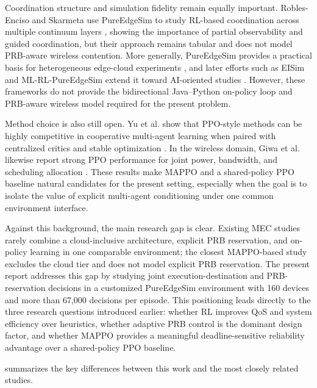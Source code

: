 Coordination structure and simulation fidelity remain equally important. Robles-Enciso and Skarmeta use PureEdgeSim to study RL-based coordination across multiple continuum layers \cite{robles2022continuum, robles2023multilayer}, showing the importance of partial observability and guided coordination, but their approach remains tabular and does not model PRB-aware wireless contention. More generally, PureEdgeSim provides a practical basis for heterogeneous edge-cloud experiments \cite{mechalikh2021pureedgesim}, and later efforts such as EISim and ML-RL-PureEdgeSim extend it toward AI-oriented studies \cite{abid2023eisim, mlrlpureedgesimgithub}. However, these frameworks do not provide the bidirectional Java--Python on-policy loop and PRB-aware wireless model required for the present problem.

Method choice is also still open. Yu et al. show that PPO-style methods can be highly competitive in cooperative multi-agent learning when paired with centralized critics and stable optimization \cite{yu2022surprising}. In the wireless domain, Giwa et al. likewise report strong PPO performance for joint power, bandwidth, and scheduling allocation \cite{giwa2025hetnet}. These results make MAPPO and a shared-policy PPO baseline natural candidates for the present setting, especially when the goal is to isolate the value of explicit multi-agent conditioning under one common environment interface.

Against this background, the main research gap is clear. Existing MEC studies rarely combine a cloud-inclusive architecture, explicit PRB reservation, and on-policy learning in one comparable environment; the closest MAPPO-based study \cite{sun2023hdmappo} excludes the cloud tier and does not model explicit PRB reservation. The present report addresses this gap by studying joint execution-destination and PRB-reservation decisions in a customized PureEdgeSim environment with 160 devices and more than 67,000 decisions per episode. This positioning leads directly to the three research questions introduced earlier: whether RL improves QoS and system efficiency over heuristics, whether adaptive PRB control is the dominant design factor, and whether MAPPO provides a meaningful deadline-sensitive reliability advantage over a shared-policy PPO baseline.

 summarizes the key differences between this work and the most closely related studies.

